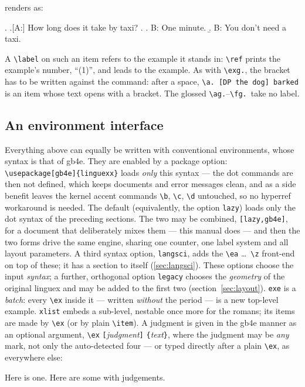\documentclass[11pt,a4paper]{article}
\newcommand{\cs}[1]{\texttt{\textbackslash #1}}
\newcommand{\pkg}[2][]{\textsf{#2}}
\newcommand{\opt}[1]{\texttt{#1}}
\newcommand{\meta}[1]{\textrm{\itshape\textlangle#1\textrangle}}
\newcommand{\marg}[1]{\penalty300 \texttt{\{}\meta{#1}\texttt{\}}}
\newcommand{\oarg}[1]{\penalty300 \texttt{[}\meta{#1}\texttt{]}}
\newcommand{\rendered}{\par\medskip\noindent\textcolor{gray!70}{\small renders as:}\par\nobreak\smallskip}
\newcommand{\afterex}{\par\addvspace{\medskipamount}}
\begin{document}
\rendered
\ex. \a.[A:] How long does it take by taxi?
\z.
\a. B: One minute.
\b. B: You don't need a taxi.

\afterex
\noindent A \cs{label} on such an item refers to the example it stands in:
\cs{ref} prints the example's number, ``(1)'', and leads to the example.
As with \cs{exg.}, the bracket has to be written against the command:
after a space, \verb|\a. [DP the dog] barked| is an item whose text opens
with a bracket. The glossed \cs{ag.}--\cs{fg.}\ take no label.

\subsection{An environment interface}\label{sec:envs}

Everything above can equally be written with conventional environments,
whose syntax is that of \pkg{gb4e}. They are enabled by a package
option: \cs{usepackage[gb4e]\{linguexx\}} loads \emph{only} this
syntax --- the dot commands are then not defined, which keeps documents
and error messages clean, and as a side benefit leaves the kernel accent
commands \cs{b}, \cs{c}, \cs{d} untouched, so no \pkg{hyperref}
workaround is needed. The default (equivalently, the option
\opt{lazy}) loads only the dot syntax of the preceding sections. The
two may be combined, \opt{[lazy,gb4e]}, for a document that
deliberately mixes them --- this manual does --- and then the two forms
drive the same engine, sharing one counter, one label system and all
layout parameters. A third syntax option, \opt{langsci},
adds the \cs{ea} \dots\ \cs{z} front-end on top of these; it has a section
to itself (\ref{sec:langsci}). These options choose the input
\emph{syntax}; a further, orthogonal option \opt{legacy} chooses the
\emph{geometry} of the original \pkg{linguex} and may be added to the
first two (section~\ref{sec:layout}). \texttt{exe} is a \emph{batch}:
every \cs{ex} inside it --- written \emph{without} the period --- is a
new top-level example. \texttt{xlist} embeds a sub-level, nestable once
more for the romans; its items are made by \cs{ex} (or by plain
\cs{item}). A judgment is given in the \pkg{gb4e} manner as an optional
argument, \cs{ex}\oarg{judgment}\marg{text}, where the judgment may be
\emph{any} mark, not only the auto-detected four --- or typed directly
after a plain \cs{ex}, as everywhere else:

\begin{code}
\begin{exe}
\ex\label{here} Here is one.
\ex Here are some with judgements.
 \begin{xlist}
 \end{xlist}
\end{exe}
\end{code}
\end{document}
